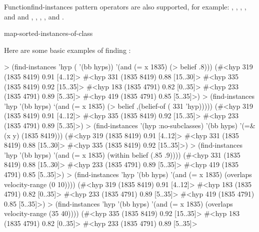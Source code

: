 \documentclass[10pt,twoside,english,pdftex]{article}
\begin{document}
\begin{functiondoc}{Function}{find-instances}
 pattern operators are also
supported, for example: \code{=\&}, \code{=\$\&}, \code{=\$}, \code{=\$\$},
and \code{=\$\$\$} and , , ,
, and .

\begin{alsos}{map-sorted-instances-of-class}
\end{alsos}

\fnexamples
{}%
%
%
Here are some basic examples of finding  :
%
\W\supp
\begin{example}
  > (find-instances 'hyp ( '(bb hyps)) 
      '(and (= x 1835) (> belief .8)))
  (#<hyp 319 (1835 8419) 0.91 [4..12]>
   #<hyp 331 (1835 8419) 0.88 [15..30]>
   #<hyp 335 (1835 8419) 0.92 [15..35]>
   #<hyp 183 (1835 4791) 0.82 [0..35]>
   #<hyp 233 (1835 4791) 0.89 [5..35]>
   #<hyp 419 (1835 4791) 0.85 [5..35]>)\goodpagebreak
  > (find-instances 'hyp '(bb hyps)
      `(and (= x 1835) 
            (> belief ,(belief-of ( 331 'hyp)))))
  (#<hyp 319 (1835 8419) 0.91 [4..12]>
   #<hyp 335 (1835 8419) 0.92 [15..35]>
   #<hyp 233 (1835 4791) 0.89 [5..35]>)\goodpagebreak
  > (find-instances '(hyp :no-subclasses) '(bb hyps)
      '(=\& (x y) (1835 8419)))
  (#<hyp 319 (1835 8419) 0.91 [4..12]>
   #<hyp 331 (1835 8419) 0.88 [15..30]>
   #<hyp 335 (1835 8419) 0.92 [15..35]>)\goodpagebreak
  > (find-instances 'hyp '(bb hyps) 
      '(and (= x 1835) (within belief (.85 .9))))
  (#<hyp 331 (1835 8419) 0.88 [15..30]>
   #<hyp 233 (1835 4791) 0.89 [5..35]>
   #<hyp 419 (1835 4791) 0.85 [5..35]>)\goodpagebreak
  > (find-instances 'hyp '(bb hyps) 
      '(and (= x 1835) (overlaps velocity-range (0 10))))
  (#<hyp 319 (1835 8419) 0.91 [4..12]>
   #<hyp 183 (1835 4791) 0.82 [0..35]>
   #<hyp 233 (1835 4791) 0.89 [5..35]>
   #<hyp 419 (1835 4791) 0.85 [5..35]>)\goodpagebreak
  > (find-instances 'hyp '(bb hyps) 
      '(and (= x 1835) (overlaps velocity-range (35 40))))
  (#<hyp 335 (1835 8419) 0.92 [15..35]>
   #<hyp 183 (1835 4791) 0.82 [0..35]>
   #<hyp 233 (1835 4791) 0.89 [5..35]>

\end{example}
\end{functiondoc}
\end{document}
